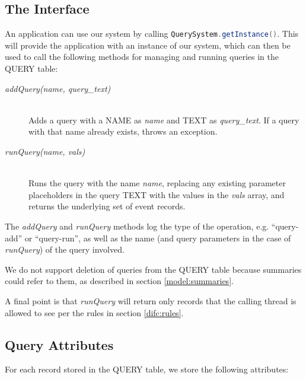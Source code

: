 \subsection{The Interface}
\label{model:query-system}

An application can use our system by calling \lstinline[language=Java]$QuerySystem.getInstance()$. This will provide the application with an instance of our system, which can then be used to call the following methods for managing and running queries in the QUERY table:
\begin{description}
  \item[\emph{addQuery(name, query\_text)}] \ \\
    Adds a query with a NAME as \emph{name}
    and TEXT as \emph{query\_text}. If a query with that
    name already exists, throws an exception.
  \item[\emph{runQuery(name, vals)}] \ \\
    Runs the query with the name \emph{name}, 
    replacing any existing
    parameter placeholders in the query TEXT with
    the values in the \emph{vals} array, and 
    returns the underlying set of event records.
\end{description}

\noindent
The \emph{addQuery} and \emph{runQuery} methods log the type of the operation, e.g. ``query-add'' or ``query-run'', as well as the name (and query parameters in the case of \emph{runQuery}) of the query involved.

We do not support deletion of queries from the QUERY table because summaries could refer to them, as described in section \ref{model:summaries}.

A final point is that \emph{runQuery} will return only records that the calling thread is allowed to see per the rules in section \ref{difc:rules}.

\subsection{Query Attributes}

For each record stored in the QUERY table, we store the following attributes:

